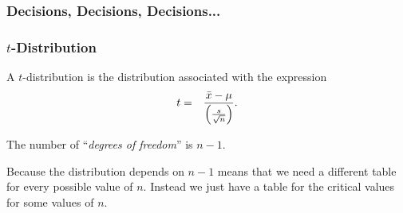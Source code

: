 \begin{frame}
  \frametitle{Decisions, Decisions, Decisions...}

\end{frame}


\begin{frame}
  \frametitle{$t$-Distribution}

  \begin{definition}[$t$-Distribution]

    A $t$-distribution is the distribution associated with the expression
    \begin{eqnarray*}
      t &  = & \frac{\bar{x}-\mu}{\left( \frac{s}{\sqrt{n}} \right)}.
    \end{eqnarray*}

    The number of ``\textit{degrees of freedom}'' is $n-1$.
    
  \end{definition}

  Because the distribution depends on $n-1$ means that we need a
  different table for every possible value of $n$. Instead we just
  have a table for the critical values for some values of $n$.
  

\end{frame}


